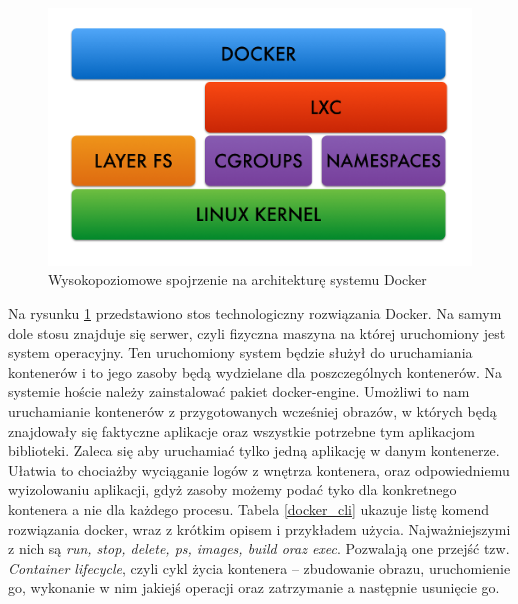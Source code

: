 \documentclass[10pt,a4paper,titlepage,twoside]{report}
\begin{document}
\begin{figure}[ht!]
	\centering
	\includegraphics[scale=0.7]{pics/docker_arch.png}
	\caption{Wysokopoziomowe spojrzenie na architekturę systemu Docker}
	\label{docker_arch}
\end{figure}

Na rysunku \ref{docker_arch} przedstawiono stos technologiczny rozwiązania Docker. Na samym dole stosu znajduje się serwer, czyli fizyczna maszyna na której uruchomiony jest system operacyjny. Ten uruchomiony system będzie służył do uruchamiania kontenerów i to jego zasoby będą wydzielane dla poszczególnych kontenerów. Na systemie hoście należy zainstalować pakiet docker-engine. Umożliwi to nam uruchamianie kontenerów z przygotowanych wcześniej obrazów, w których będą znajdowały się faktyczne aplikacje oraz wszystkie potrzebne tym aplikacjom biblioteki. Zaleca się aby uruchamiać tylko jedną aplikację w danym kontenerze. Ułatwia to chociażby wyciąganie logów z wnętrza kontenera, oraz odpowiedniemu wyizolowaniu aplikacji, gdyż zasoby możemy podać tyko dla konkretnego kontenera a nie dla każdego procesu. Tabela \ref{docker_cli} ukazuje listę komend rozwiązania docker, wraz z krótkim opisem i przykładem użycia. Najważniejszymi z nich są \textit{run, stop, delete, ps, images, build oraz exec}. Pozwalają one przejść tzw. \textit{Container lifecycle}, czyli cykl życia kontenera – zbudowanie obrazu, uruchomienie go, wykonanie w nim jakiejś operacji oraz zatrzymanie a następnie usunięcie go.
\end{document}

